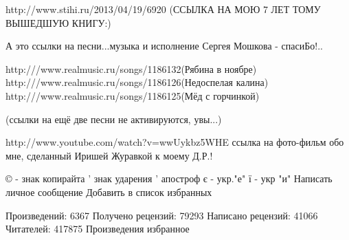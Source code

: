 http://www.stihi.ru/2013/04/19/6920
(ССЫЛКА НА МОЮ 7 ЛЕТ ТОМУ ВЫШЕДШУЮ КНИГУ:)

А это ссылки на песни...музыка и исполнение Сергея Мошкова - спасиБо!..

http:///www.realmusic.ru/songs/1186132(Рябина в ноябре)
http:///www.realmusic.ru/songs/1186126(Недоспелая калина)
http:///www.realmusic.ru/songs/1186125(Мёд с горчинкой)

(ссылки на ещё две песни не активируются, увы...)

http://www.youtube.com/watch?v=wwUykbz5WHE
ссылка на фото-фильм обо мне, сделанный Иришей Журавкой к моему Д.Р.!

© - знак копирайта
' знак ударения
’ апостроф
є - укр."е"
ї - укр "и"
Написать личное сообщение    Добавить в список избранных

Произведений: 6367
Получено рецензий: 79293
Написано рецензий: 41066
Читателей: 417875
Произведения
избранное


